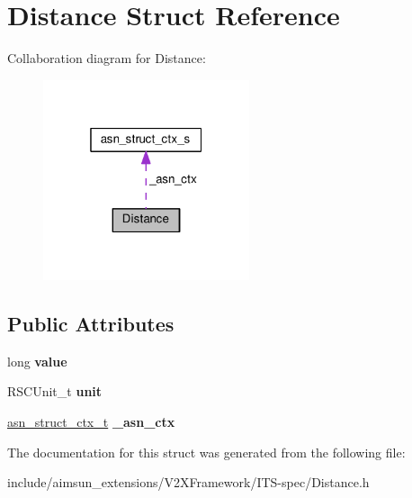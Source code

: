 \hypertarget{structDistance}{}\section{Distance Struct Reference}
\label{structDistance}


Collaboration diagram for Distance\+:\nopagebreak
\begin{figure}[H]
\begin{center}
\leavevmode
\includegraphics[width=172pt]{structDistance__coll__graph}
\end{center}
\end{figure}
\subsection*{Public Attributes}
\begin{DoxyCompactItemize}
\item 
long {\bfseries value}\hypertarget{structDistance_a34df2d53d09be061b21fe8d0933f66b2}{}\label{structDistance_a34df2d53d09be061b21fe8d0933f66b2}

\item 
R\+S\+C\+Unit\+\_\+t {\bfseries unit}\hypertarget{structDistance_a78764dab4688f54586cea42d4d58464e}{}\label{structDistance_a78764dab4688f54586cea42d4d58464e}

\item 
\hyperlink{structasn__struct__ctx__s}{asn\+\_\+struct\+\_\+ctx\+\_\+t} {\bfseries \+\_\+asn\+\_\+ctx}\hypertarget{structDistance_a7115517b656a9e31dd96f1ebfea83d86}{}\label{structDistance_a7115517b656a9e31dd96f1ebfea83d86}

\end{DoxyCompactItemize}


The documentation for this struct was generated from the following file\+:\begin{DoxyCompactItemize}
\item 
include/aimsun\+\_\+extensions/\+V2\+X\+Framework/\+I\+T\+S-\/spec/Distance.\+h\end{DoxyCompactItemize}
